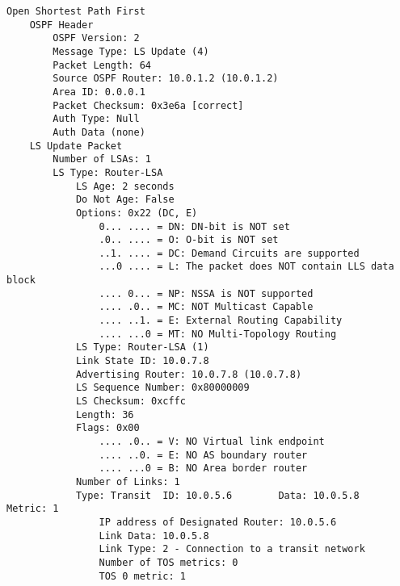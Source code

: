 \begin{lstlisting}
Open Shortest Path First
    OSPF Header
        OSPF Version: 2
        Message Type: LS Update (4)
        Packet Length: 64
        Source OSPF Router: 10.0.1.2 (10.0.1.2)
        Area ID: 0.0.0.1
        Packet Checksum: 0x3e6a [correct]
        Auth Type: Null
        Auth Data (none)
    LS Update Packet
        Number of LSAs: 1
        LS Type: Router-LSA
            LS Age: 2 seconds
            Do Not Age: False
            Options: 0x22 (DC, E)
                0... .... = DN: DN-bit is NOT set
                .0.. .... = O: O-bit is NOT set
                ..1. .... = DC: Demand Circuits are supported
                ...0 .... = L: The packet does NOT contain LLS data block
                .... 0... = NP: NSSA is NOT supported
                .... .0.. = MC: NOT Multicast Capable
                .... ..1. = E: External Routing Capability
                .... ...0 = MT: NO Multi-Topology Routing
            LS Type: Router-LSA (1)
            Link State ID: 10.0.7.8
            Advertising Router: 10.0.7.8 (10.0.7.8)
            LS Sequence Number: 0x80000009
            LS Checksum: 0xcffc
            Length: 36
            Flags: 0x00
                .... .0.. = V: NO Virtual link endpoint
                .... ..0. = E: NO AS boundary router
                .... ...0 = B: NO Area border router
            Number of Links: 1
            Type: Transit  ID: 10.0.5.6        Data: 10.0.5.8        Metric: 1
                IP address of Designated Router: 10.0.5.6
                Link Data: 10.0.5.8
                Link Type: 2 - Connection to a transit network
                Number of TOS metrics: 0
                TOS 0 metric: 1
\end{lstlisting}

